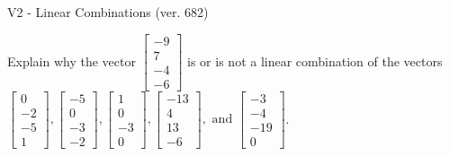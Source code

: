 \begin{exercise}
  \begin{exerciseTitle}V2 - Linear Combinations (ver. 682)\end{exerciseTitle}
  \begin{exerciseStatement}
    Explain why the vector \(\left[\begin{array}{c}
-9 \\
7 \\
-4 \\
-6
\end{array}\right]\)  is or is not a linear 
	combination of the vectors \(\left[\begin{array}{c}
0 \\
-2 \\
-5 \\
1
\end{array}\right] , \left[\begin{array}{c}
-5 \\
0 \\
-3 \\
-2
\end{array}\right] , \left[\begin{array}{c}
1 \\
0 \\
-3 \\
0
\end{array}\right] , \left[\begin{array}{c}
-13 \\
4 \\
13 \\
-6
\end{array}\right] , \text{ and } \left[\begin{array}{c}
-3 \\
-4 \\
-19 \\
0
\end{array}\right]\).
	



\end{exerciseStatement}
\end{exercise}

